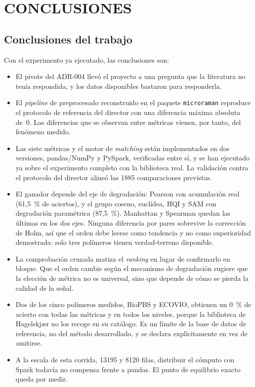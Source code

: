 \chapter{CONCLUSIONES}

\section{Conclusiones del trabajo}

Con el experimento ya ejecutado, las conclusiones son:

\begin{itemize}
    \item El pivote del ADR-004 llevó el proyecto a una pregunta que la literatura no tenía respondida, y los datos disponibles bastaron para responderla.
    \item El \textit{pipeline} de preprocesado reconstruido en el paquete \texttt{microraman} reproduce el protocolo de referencia del director con una diferencia máxima absoluta de~0. Las diferencias que se observan entre métricas vienen, por tanto, del fenómeno medido.
    \item Las siete métricas y el motor de \textit{matching} están implementados en dos versiones, pandas/NumPy y PySpark, verificadas entre sí, y se han ejecutado ya sobre el experimento completo con la biblioteca real. La validación contra el protocolo del director alineó las 1885 comparaciones previstas.
    \item El ganador depende del eje de degradación: Pearson con acumulación real (61,5~\% de aciertos), y el grupo coseno, euclídea, HQI y SAM con degradación paramétrica (87,5~\%). Manhattan y Spearman quedan las últimas en los dos ejes. Ninguna diferencia por pares sobrevive la corrección de Holm, así que el orden debe leerse como tendencia y no como superioridad demostrada: solo tres polímeros tienen verdad-terreno disponible.
    \item La comprobación cruzada matiza el \textit{ranking} en lugar de confirmarlo en bloque. Que el orden cambie según el mecanismo de degradación sugiere que la elección de métrica no es universal, sino que depende de cómo se pierda la calidad de la señal.
    \item Dos de los cinco polímeros medidos, BioPBS y ECOVIO, obtienen un 0~\% de acierto con todas las métricas y en todos los niveles, porque la biblioteca de Hagelskjær no los recoge en su catálogo. Es un límite de la base de datos de referencia, no del método desarrollado, y se declara explícitamente en vez de omitirse.
    \item A la escala de esta corrida, 13195 y 8120 filas, distribuir el cómputo con Spark todavía no compensa frente a pandas. El punto de equilibrio exacto queda por medir.
\end{itemize}

